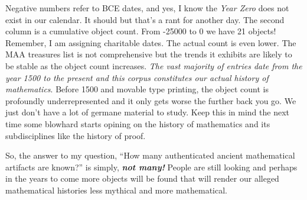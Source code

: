 Negative numbers refer to BCE dates, and yes, I know the \emph{Year
Zero} does not exist in our calendar. It should but that's a rant for
another day. The second column is a cumulative object count. From -25000
to 0 we have 21 objects! Remember, I am assigning charitable dates. The
actual count is even lower. The MAA treasures list is not comprehensive
but the trends it exhibits are likely to be stable as the object count
increases. \emph{The vast majority of entries date from the year 1500 to
the present and this corpus constitutes our actual history of
mathematics}. Before 1500 and movable type printing, the object count is
profoundly underrepresented and it only gets worse the further back you
go. We just don't have a lot of germane material to study. Keep this in
mind the next time some blowhard starts opining on the history of
mathematics and its subdisciplines like the history of proof.

So, the answer to my question, ``How many authenticated ancient
mathematical artifacts are known?'' is simply, \textbf{\emph{not many!}}
People are still looking and perhaps in the years to come more objects
will be found that will render our alleged mathematical histories less
mythical and more mathematical.


%

